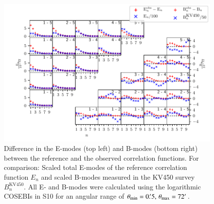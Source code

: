 \documentclass{aa}
\renewcommand{\rm}{\mathrm}
\begin{document}
\begin{figure}
\centering
\includegraphics[width = 0.9\linewidth]{images/ebmodes0p5t72.pdf}
\caption{Difference in the E-modes (top left) and B-modes (bottom right) between the reference and the observed correlation functions. For comparison: Scaled total E-modes of the reference correlation function $E_n$ and scaled B-modes measured in the KV450 survey $B_n^{\rm{KV450}}$. All E- and B-modes were calculated using the logarithmic COSEBIs in S10 for an angular range of $\theta_{\rm{min}}=0.\!^\prime 5,\,\theta_{\rm{max}}=72\arcmin$.}
\label{fig:bmodes_cosebi}
\end{figure}
\end{document}

